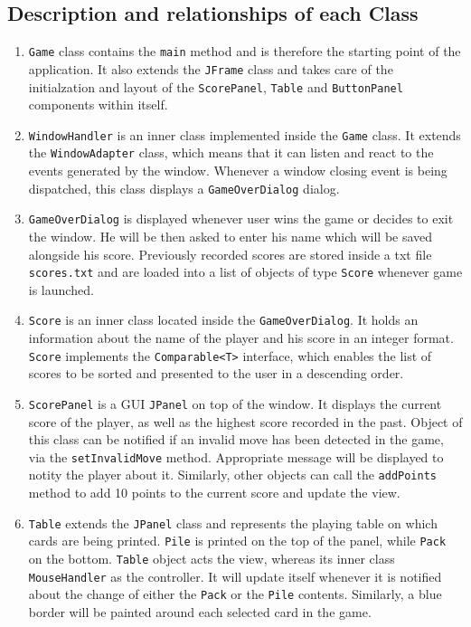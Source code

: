 \documentclass[a4paper, 12pt, titlepage]{article}
\begin{document}
\subsection{Description and relationships of each Class}
\begin{enumerate}
	\item \texttt{Game} class contains the \texttt{main} method and is therefore the 
		starting point of the application. It also extends the \texttt{JFrame} class and 
		takes care of the initialzation and layout of the \texttt{ScorePanel}, 
		\texttt{Table} and \texttt{ButtonPanel} components within itself.
		
	\item \texttt{WindowHandler} is an inner class implemented inside the \texttt{Game}
		class. It extends the \texttt{WindowAdapter} class, which means that it can 
		listen and react to the events generated by the window. Whenever a window closing 
		event is being dispatched, this class displays a \texttt{GameOverDialog} dialog.
		
	\item \texttt{GameOverDialog} is displayed whenever user wins the game or decides to
		exit the window. He will be then asked to enter his name which will be saved
		alongside his score. Previously recorded scores are stored inside a txt file
		\texttt{scores.txt} and are loaded into a list of objects of type \texttt{Score}
		whenever game is launched.
		
	\item \texttt{Score} is an inner class located inside the \texttt{GameOverDialog}. 
		It holds an information about the name of the player and his score in an integer
		format. \texttt{Score} implements the \texttt{Comparable<T>} interface, which 
		enables the list of scores to be sorted and presented to the user in a
		descending order.
		
	\item \texttt{ScorePanel} is a GUI \texttt{JPanel} on top of the window. It displays
		the current score of the player, as well as the highest score recorded in the 
		past. Object of this class can be notified if an invalid move has been detected 
		in the game, via the \texttt{setInvalidMove} method. Appropriate message will be 
		displayed to notity the player about it. Similarly, other objects can call 
		the \texttt{addPoints} method to add 10 points to the current score and update
		the view.
		
	\item \texttt{Table} extends the \texttt{JPanel} class and represents the playing 
		table on which cards are being printed. \texttt{Pile} is printed on the top of 
		the panel, while \texttt{Pack} on the bottom. \texttt{Table} object acts the 
		view, whereas its inner class \texttt{MouseHandler} as the controller. 
		It will update itself whenever it is notified about the change of
		either the \texttt{Pack} or the \texttt{Pile} contents. Similarly, a blue border
		will be painted around each selected card in the game.
		

\end{enumerate}
\end{document}
